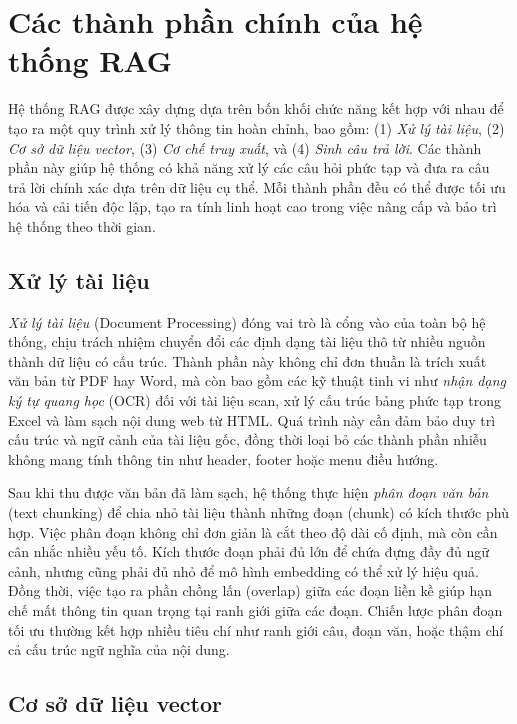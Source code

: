 \section{Các thành phần chính của hệ thống RAG}

Hệ thống RAG được xây dựng dựa trên bốn khối chức năng kết hợp với nhau để tạo ra một quy trình xử lý thông tin hoàn chỉnh, bao gồm: (1) \emph{Xử lý tài liệu}, (2) \emph{Cơ sở dữ liệu vector}, (3) \emph{Cơ chế truy xuất}, và (4) \textit{Sinh câu trả lời}. Các thành phần này giúp hệ thống có khả năng xử lý các câu hỏi phức tạp và đưa ra câu trả lời chính xác dựa trên dữ liệu cụ thể. Mỗi thành phần đều có thể được tối ưu hóa và cải tiến độc lập, tạo ra tính linh hoạt cao trong việc nâng cấp và bảo trì hệ thống theo thời gian.

\subsection{Xử lý tài liệu}

\emph{Xử lý tài liệu} (Document Processing) đóng vai trò là cổng vào của toàn bộ hệ thống, chịu trách nhiệm chuyển đổi các định dạng tài liệu thô từ nhiều nguồn thành dữ liệu có cấu trúc. Thành phần này không chỉ đơn thuần là trích xuất văn bản từ PDF hay Word, mà còn bao gồm các kỹ thuật tinh vi như \emph{nhận dạng ký tự quang học} (OCR) đối với tài liệu scan, xử lý cấu trúc bảng phức tạp trong Excel và làm sạch nội dung web từ HTML. Quá trình này cần đảm bảo duy trì cấu trúc và ngữ cảnh của tài liệu gốc, đồng thời loại bỏ các thành phần nhiễu không mang tính thông tin như header, footer hoặc menu điều hướng.

Sau khi thu được văn bản đã làm sạch, hệ thống thực hiện \emph{phân đoạn văn bản} (text chunking) để chia nhỏ tài liệu thành những đoạn (chunk) có kích thước phù hợp. Việc phân đoạn không chỉ đơn giản là cắt theo độ dài cố định, mà còn cần cân nhắc nhiều yếu tố. Kích thước đoạn phải đủ lớn để chứa đựng đầy đủ ngữ cảnh, nhưng cũng phải đủ nhỏ để mô hình embedding có thể xử lý hiệu quả. Đồng thời, việc tạo ra phần chồng lấn (overlap) giữa các đoạn liền kề giúp hạn chế mất thông tin quan trọng tại ranh giới giữa các đoạn. Chiến lược phân đoạn tối ưu thường kết hợp nhiều tiêu chí như ranh giới câu, đoạn văn, hoặc thậm chí cả cấu trúc ngữ nghĩa của nội dung.

\subsection{Cơ sở dữ liệu vector}

